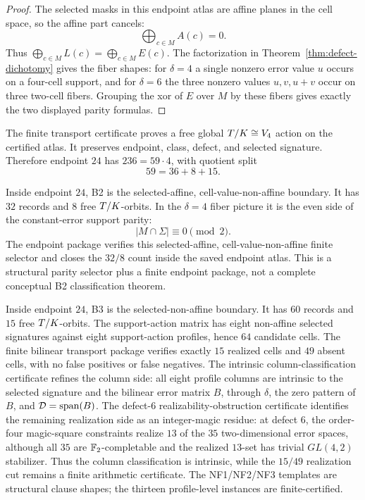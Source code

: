 \begin{proof}
The selected masks in this endpoint atlas are affine planes in the cell space,
so the affine part cancels:
\[
  \bigoplus_{c\in M}A(c)=0.
\]
Thus \(\bigoplus_{c\in M}L(c)=\bigoplus_{c\in M}E(c)\).  The factorization in
Theorem~\ref{thm:defect-dichotomy} gives the fiber shapes: for \(\delta=4\) a
single nonzero error value \(u\) occurs on a four-cell support, and for
\(\delta=6\) the three nonzero values \(u,v,u+v\) occur on three two-cell
fibers.  Grouping the xor of \(E\) over \(M\) by these fibers gives exactly the
two displayed parity formulas.
\end{proof}

\begin{certprop}
\label{cert:tk-transport}
The finite transport certificate proves a free global \(T/K\cong V_4\) action on
the certified atlas.  It preserves endpoint, class, defect, and selected
signature.  Therefore endpoint \(24\) has \(236=59\cdot4\), with quotient split
\[
  59=36+8+15.
\]
\end{certprop}

\begin{certprop}
\label{cert:b2-boundary}
Inside endpoint \(24\), B2 is the selected-affine, cell-value-non-affine
boundary.  It has \(32\) records and \(8\) free \(T/K\)-orbits.  In the
\(\delta=4\) fiber picture it is the even side of the constant-error support
parity:
\[
  |M\cap\Sigma|\equiv0\pmod2.
\]
The endpoint package verifies this selected-affine, cell-value-non-affine
finite selector and closes the \(32/8\) count inside the saved endpoint atlas.
This is a structural parity selector plus a finite endpoint package, not a
complete conceptual B2 classification theorem.
\end{certprop}

\begin{certprop}
\label{cert:b3-support-action}
Inside endpoint \(24\), B3 is the selected-non-affine boundary.  It has
\(60\) records and \(15\) free \(T/K\)-orbits.  The support-action matrix has
eight non-affine selected signatures against eight support-action profiles,
hence \(64\) candidate cells.  The finite bilinear transport package verifies
exactly \(15\) realized cells and \(49\) absent cells, with no false positives
or false negatives.  The intrinsic column-classification certificate refines
the column side: all eight profile columns are intrinsic to the selected
signature and the bilinear error matrix \(B\), through \(\delta\), the zero
pattern of \(B\), and \(\mathcal D=\operatorname{span}(B)\).  The defect-6
realizability-obstruction certificate identifies the remaining realization side
as an integer-magic residue: at defect \(6\), the order-four magic-square
constraints realize \(13\) of the \(35\) two-dimensional error spaces, although
all \(35\) are \(\mathbb F_2\)-completable and the realized \(13\)-set has trivial
\(GL(4,2)\) stabilizer.  Thus the column classification is intrinsic, while
the \(15/49\) realization cut remains a finite arithmetic certificate.  The
NF1/NF2/NF3 templates are structural clause shapes; the thirteen profile-level
instances are finite-certified.
\end{certprop}


